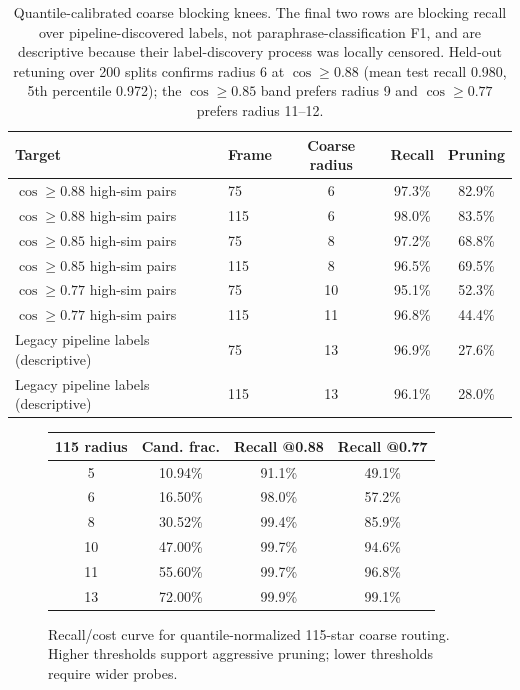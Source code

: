 \documentclass[11pt]{article}
\begin{document}
\begin{table}[t]
\centering
\small
\begin{tabular}{@{}llccc@{}}
\toprule
Target & Frame & Coarse radius & Recall & Pruning \\
\midrule
$\cos\geq0.88$ high-sim pairs & 75 & 6 & 97.3\% & 82.9\% \\
$\cos\geq0.88$ high-sim pairs & 115 & 6 & 98.0\% & 83.5\% \\
$\cos\geq0.85$ high-sim pairs & 75 & 8 & 97.2\% & 68.8\% \\
$\cos\geq0.85$ high-sim pairs & 115 & 8 & 96.5\% & 69.5\% \\
$\cos\geq0.77$ high-sim pairs & 75 & 10 & 95.1\% & 52.3\% \\
$\cos\geq0.77$ high-sim pairs & 115 & 11 & 96.8\% & 44.4\% \\
Legacy pipeline labels (descriptive) & 75 & 13 & 96.9\% & 27.6\% \\
Legacy pipeline labels (descriptive) & 115 & 13 & 96.1\% & 28.0\% \\
\bottomrule
\end{tabular}
\caption{Quantile-calibrated coarse blocking knees. The final two rows are blocking recall over pipeline-discovered labels, not paraphrase-classification F1, and are descriptive because their label-discovery process was locally censored. Held-out retuning over 200 splits confirms radius 6 at $\cos\geq0.88$ (mean test recall 0.980, 5th percentile 0.972); the $\cos\geq0.85$ band prefers radius 9 and $\cos\geq0.77$ prefers radius 11--12.}
\label{tab:blocking-knees}
\end{table}

\begin{figure}[t]
\centering
\small
\begin{tabular}{@{}cccc@{}}
\toprule
115 radius & Cand. frac. & Recall @0.88 & Recall @0.77 \\
\midrule
5 & 10.94\% & 91.1\% & 49.1\% \\
6 & 16.50\% & 98.0\% & 57.2\% \\
8 & 30.52\% & 99.4\% & 85.9\% \\
10 & 47.00\% & 99.7\% & 94.6\% \\
11 & 55.60\% & 99.7\% & 96.8\% \\
13 & 72.00\% & 99.9\% & 99.1\% \\
\bottomrule
\end{tabular}
\caption{Recall/cost curve for quantile-normalized 115-star coarse routing. Higher thresholds support aggressive pruning; lower thresholds require wider probes.}
\label{fig:recall-cost}
\end{figure}
\end{document}
